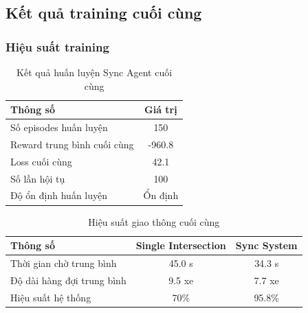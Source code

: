         
        

\subsection{Kết quả training cuối cùng}

\subsubsection{Hiệu suất training}
\begin{table}[!htp]
    \centering
    \caption{Kết quả huấn luyện Sync Agent cuối cùng}
    \label{tab:sync_final_training}
    \begin{tabular}{@{}lc@{}}
        \toprule \textbf{Thông số}      & \textbf{Giá trị}       \\
        \midrule Số episodes huấn luyện     & 150                    \\
        Reward trung bình cuối cùng          & -960.8                 \\
        Loss cuối cùng                    & 42.1                   \\
        Số lần hội tụ           & 100                    \\
        Độ ổn định huấn luyện            & Ổn định                \\
        \bottomrule
    \end{tabular}
\end{table}

\begin{table}[!htp]
    \centering
    \caption{Hiệu suất giao thông cuối cùng}
    \label{tab:sync_final_performance}
    \begin{tabular}{@{}lcc@{}}
        \toprule \textbf{Thông số} & \textbf{Single Intersection} & \textbf{Sync System} \\
        \midrule 
        Thời gian chờ trung bình & 45.0 s & 34.3 s \\
        Độ dài hàng đợi trung bình & 9.5 xe & 7.7 xe \\
        Hiệu suất hệ thống & 70\% & 95.8\% \\
        \bottomrule
    \end{tabular}
\end{table}

